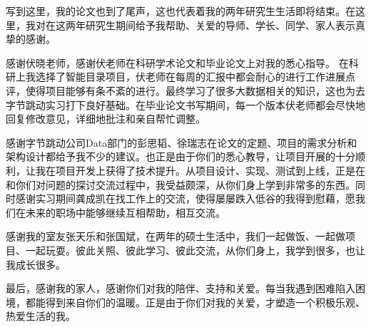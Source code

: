 \documentclass[winfonts,master,twoside]{njuthesis}
\begin{document}














\begin{acknowledgement}
写到这里，我的论文也到了尾声，这也代表着我的两年研究生生活即将结束。在这里，我对在这两年研究生期间给予我帮助、关爱的导师、学长、同学、家人表示真挚的感谢。

感谢伏晓老师，感谢伏老师在科研学术论文和毕业论文上对我的悉心指导。
在科研上我选择了智能目录项目，伏老师在每周的汇报中都会耐心的进行工作进展点评，使得项目能够有条不紊的进行。最终学习了很多大数据相关的知识，这也为去字节跳动实习打下良好基础。在毕业论文书写期间，每一个版本伏老师都会尽快地回复修改意见，详细地批注和亲自帮忙调整。

感谢字节跳动公司Data部门的彭思韬、徐瑞志在论文的定题、项目的需求分析和架构设计都给予我不少的建议。也正是由于你们的悉心教导，让项目开展的十分顺利，让我在项目开发上获得了技术提升。从项目设计、实现、测试到上线，正是在和你们对问题的探讨交流过程中，我受益颇深，从你们身上学到非常多的东西。同时感谢实习期间龚成凯在找工作上的交流，使得屡屡跌入低谷的我得到慰藉，愿我们在未来的职场中能够继续互相帮助，相互交流。

感谢我的室友张天乐和张国斌，在两年的硕士生活中，我们一起做饭、一起做项目、一起玩耍。彼此关照、彼此学习、彼此交流，从你们身上，我学到很多，也让我成长很多。

最后，感谢我的家人，感谢你们对我的陪伴、支持和关爱。每当我遇到困难陷入困境，都能得到来自你们的温暖。正是由于你们对我的关爱，才塑造一个积极乐观、热爱生活的我。

\end{acknowledgement}





\end{document}
